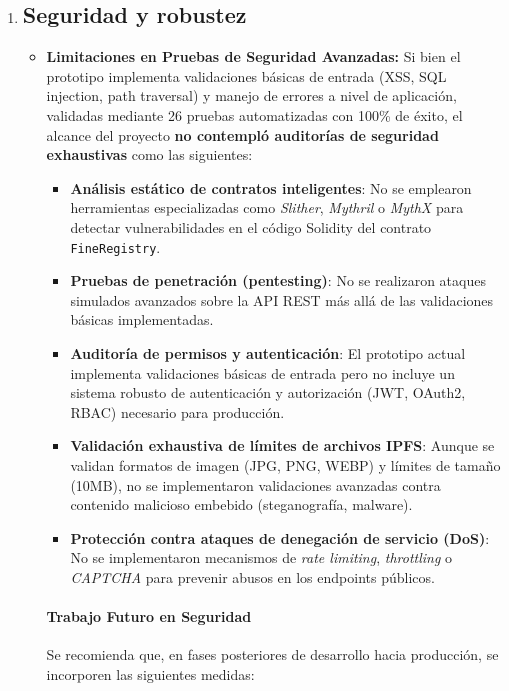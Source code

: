 \begin{enumerate}
    \item \subsection{Seguridad y robustez}
    \begin{itemize}
        \item \textbf{Limitaciones en Pruebas de Seguridad Avanzadas:} Si bien el prototipo implementa validaciones básicas de entrada (XSS, SQL injection, path traversal) y manejo de errores a nivel de aplicación, validadas mediante 26 pruebas automatizadas con 100\% de éxito, el alcance del proyecto \textbf{no contempló auditorías de seguridad exhaustivas} como las siguientes:

        \begin{itemize}
            \item \textbf{Análisis estático de contratos inteligentes}: No se emplearon herramientas especializadas como \textit{Slither}, \textit{Mythril} o \textit{MythX} para detectar vulnerabilidades en el código Solidity del contrato \texttt{FineRegistry}.

            \item \textbf{Pruebas de penetración (pentesting)}: No se realizaron ataques simulados avanzados sobre la API REST más allá de las validaciones básicas implementadas.

            \item \textbf{Auditoría de permisos y autenticación}: El prototipo actual implementa validaciones básicas de entrada pero no incluye un sistema robusto de autenticación y autorización (JWT, OAuth2, RBAC) necesario para producción.

            \item \textbf{Validación exhaustiva de límites de archivos IPFS}: Aunque se validan formatos de imagen (JPG, PNG, WEBP) y límites de tamaño (10MB), no se implementaron validaciones avanzadas contra contenido malicioso embebido (steganografía, malware).

            \item \textbf{Protección contra ataques de denegación de servicio (DoS)}: No se implementaron mecanismos de \textit{rate limiting}, \textit{throttling} o \textit{CAPTCHA} para prevenir abusos en los endpoints públicos.
        \end{itemize}

        \paragraph{Trabajo Futuro en Seguridad}
        Se recomienda que, en fases posteriores de desarrollo hacia producción, se incorporen las siguientes medidas:


\end{itemize}
\end{enumerate}
